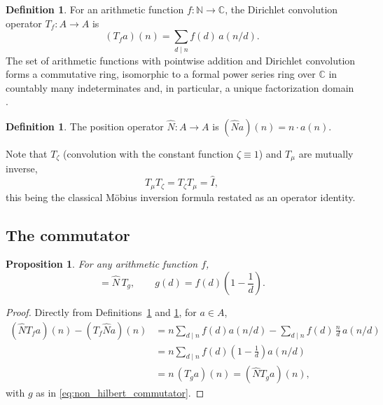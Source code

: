 \documentclass[11pt]{amsart}
\numberwithin{equation}{section}
\theoremstyle{plain}
\newtheorem{proposition}[theorem]{Proposition}
\theoremstyle{definition}
\newtheorem{definition}[theorem]{Definition}
\theoremstyle{remark}
\newcommand{\N}{\mathbb{N}}
\newcommand{\C}{\mathbb{C}}
\begin{document}
\begin{definition}
\label{def:dirichlet_convolution_operator}
For an arithmetic function $f:\N\to\C$, the Dirichlet convolution
operator $T_f:A\to A$ is
\begin{equation}
(T_f a)(n) = \sum_{d\mid n} f(d)\,a(n/d).
\label{eq:dirichlet_convolution_operator}
\end{equation}
The set of arithmetic functions with pointwise addition and Dirichlet
convolution forms a commutative ring, isomorphic to a formal power
series ring over $\C$ in countably many indeterminates and, in
particular, a unique factorization domain \cite{CashwellEverett1959}.
\end{definition}

\begin{definition}
\label{def:pointwise_position_operator}
The position operator $\hat N:A\to A$ is $(\hat N a)(n)=n\cdot a(n)$.
\end{definition}

Note that $T_\zeta$ (convolution with the constant function
$\zeta\equiv1$) and $T_\mu$ are mutually inverse,
\begin{equation}
T_\mu T_\zeta = T_\zeta T_\mu = \hat I,
\label{eq:mobius_inversion_operator}
\end{equation}
this being the classical M\"obius inversion formula restated as an
operator identity.

\subsection{The commutator}
\label{subsec:non_hilbert_commutator}

\begin{proposition}
\label{prop:non_hilbert_commutator}
For any arithmetic function $f$,
\begin{equation}
[\hat N, T_f] = \hat N\,T_g,
\qquad
g(d) = f(d)\left(1-\frac1d\right).
\label{eq:non_hilbert_commutator}
\end{equation}
\end{proposition}

\begin{proof}
Directly from Definitions~\ref{def:dirichlet_convolution_operator} and
\ref{def:pointwise_position_operator}, for $a\in A$,
\begin{align}
(\hat N T_f a)(n) - (T_f \hat N a)(n)
&= n\sum_{d\mid n}f(d)a(n/d) - \sum_{d\mid n}f(d)\,\frac{n}{d}\,a(n/d)
\label{eq:commutator_step_one}\\
&= n\sum_{d\mid n} f(d)\left(1-\frac1d\right)a(n/d)
\label{eq:commutator_step_two}\\
&= n\,(T_g a)(n)
= (\hat N T_g a)(n),
\label{eq:commutator_step_three}
\end{align}
with $g$ as in \eqref{eq:non_hilbert_commutator}.
\end{proof}
\end{document}
